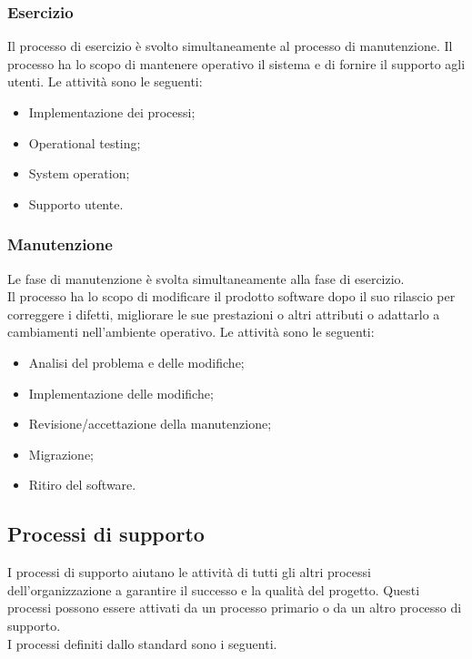 \subsubsection{Esercizio}
Il processo di esercizio è svolto simultaneamente al processo di manutenzione. Il processo ha lo scopo di mantenere operativo il sistema e di fornire il supporto agli utenti. 
Le attività sono le seguenti:

\begin{itemize}

\item Implementazione dei processi;

\item Operational testing;

\item System operation;

\item Supporto utente.

\end{itemize}

\subsubsection{Manutenzione}
Le fase di manutenzione è svolta simultaneamente alla fase di esercizio.\\
Il processo ha lo scopo di modificare il prodotto software dopo il suo rilascio per correggere i difetti, migliorare le sue prestazioni o altri attributi o adattarlo a cambiamenti nell'ambiente operativo.
Le attività sono le seguenti:

\begin{itemize}

\item Analisi del problema e delle modifiche;

\item Implementazione delle modifiche;

\item Revisione/accettazione della manutenzione;

\item Migrazione;

\item Ritiro del software.

\end{itemize}

\subsection{Processi di supporto}
I processi di supporto aiutano le attività di tutti gli altri processi dell'organizzazione a garantire il successo e la qualità del progetto.
Questi processi possono essere attivati da un processo primario o da un altro processo di supporto. \\
I processi definiti dallo standard sono i seguenti.

